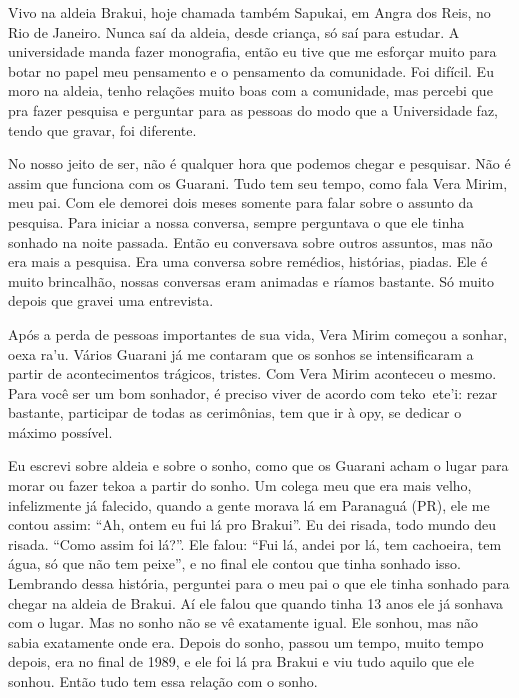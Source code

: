 \documentclass{article}
\begin{document}
Vivo na aldeia Brakui, hoje chamada tamb\'em Sapukai, em Angra dos Reis,
no Rio de Janeiro. Nunca sa\'i da aldeia, desde crian\c{c}a, s\'o sa\'i
para estudar. A universidade manda fazer monografia, ent\~ao eu tive
que me esfor\c{c}ar muito para botar no papel meu pensamento e o
pensamento da comunidade. Foi dif\'icil. Eu moro na aldeia, tenho
rela\c{c}\~oes muito boas com a comunidade, mas percebi que pra fazer
pesquisa e perguntar para as pessoas do modo que a Universidade faz,
tendo que gravar, foi diferente.

No nosso jeito de ser, n\~ao \'e qualquer hora que podemos chegar e
pesquisar. N\~ao \'e assim que funciona com os Guarani. Tudo tem seu
tempo, como fala Vera Mirim, meu pai. Com ele demorei dois meses
somente para falar sobre o assunto da pesquisa. Para iniciar a nossa
conversa, sempre perguntava o que ele tinha sonhado na noite passada.
Ent\~ao eu conversava sobre outros assuntos, mas n\~ao era mais a
pesquisa. Era uma conversa sobre rem\'edios, hist\'orias, piadas. Ele
\'e muito brincalh\~ao, nossas conversas eram animadas e r\'iamos
bastante. S\'o muito depois que gravei uma entrevista. 

Ap\'os a perda de pessoas importantes de sua vida, Vera Mirim
come\c{c}ou a sonhar, oexa ra{\textquoteright}u. V\'arios Guarani j\'a
me contaram que os sonhos se intensificaram a partir de acontecimentos
tr\'agicos, tristes. Com Vera Mirim aconteceu o mesmo. Para voc\^e ser
um bom sonhador, \'e preciso viver de acordo com
teko~ete{\textquoteright}i: rezar bastante, participar de todas as
cerim\^onias, tem que ir \`a opy, se dedicar o m\'aximo poss\'ivel.

Eu escrevi sobre aldeia e sobre o sonho, como que os Guarani acham o
lugar para morar ou fazer tekoa a partir do sonho. Um colega meu que
era mais velho, infelizmente j\'a falecido, quando a gente morava l\'a
em Paranagu\'a (PR), ele me contou assim: {\textquotedblleft}Ah, ontem
eu fui l\'a pro Brakui{\textquotedblright}. Eu dei risada, todo mundo
deu risada. {\textquotedblleft}Como assim foi
l\'a?{\textquotedblright}. Ele falou: {\textquotedblleft}Fui l\'a,
andei por l\'a, tem cachoeira, tem \'agua, s\'o que n\~ao tem
peixe{\textquotedblright}, e no final ele contou que tinha sonhado
isso. Lembrando dessa hist\'oria, perguntei para o meu pai o que ele
tinha sonhado para chegar na aldeia de Brakui. A\'i ele falou que
quando tinha 13 anos ele j\'a sonhava com o lugar. Mas no sonho n\~ao
se v\^e exatamente igual. Ele sonhou, mas n\~ao sabia exatamente onde
era. Depois do sonho, passou um tempo, muito tempo depois, era no final
de 1989, e ele foi l\'a pra Brakui e viu tudo aquilo que ele sonhou.
Ent\~ao tudo tem essa rela\c{c}\~ao com o sonho.
\end{document}
